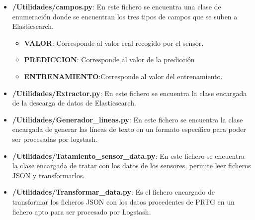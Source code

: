 \begin{itemize}
    \item \textbf{/Utilidades/campos.py}: En este fichero se encuentra una clase de enumeración donde se encuentran los tres tipos de campos que se suben a Elasticsearch.
    \begin{itemize}
        \item \textbf{VALOR}: Corresponde al valor real recogido por el sensor.

        \item \textbf{PREDICCION}: Corresponde al valor de la predicción 
        \item \textbf{ENTRENAMIENTO}:Corresponde al valor del entrenamiento.
    \end{itemize}
    
    \item \textbf{/Utilidades/Extractor.py}: En este fichero se encuentra la clase encargada de la descarga de datos de Elasticsearch.
    
    \item \textbf{/Utilidades/Generador\_lineas.py}: En este fichero se encuentra la clase encargada de generar las líneas de texto en un formato específico para poder ser procesadas por logstash. 
    
    \item \textbf{/Utilidades/Tatamiento\_sensor\_data.py}: En este fichero se encuentra la clase encargada de tratar con los datos de los sensores, permite leer ficheros JSON y transformarlos.
    
    \item \textbf{/Utilidades/Transformar\_data.py}: Es el fichero encargado de transformar los ficheros JSON con los datos procedentes de PRTG en un fichero apto para ser procesado por Logstash. 
    
\end{itemize}

\begin{comment}
\subsection{Mover ficheros al servidor}
En este apartado se mostrará una forma en la que se pueden mover ficheros entre un servidor ubuntu y el host.

c:\pscp elk@192.168.0.29:MonitorzacionIOT\_1.0\_all.deb .

c:\pscp "C:\Users\mella\Documents\MonitorzacionIOT\_1.0\_all.deb"

pi@192.168.0.31:MonitorzacionIOT\_1.0\_all.deb
\end{comment}

